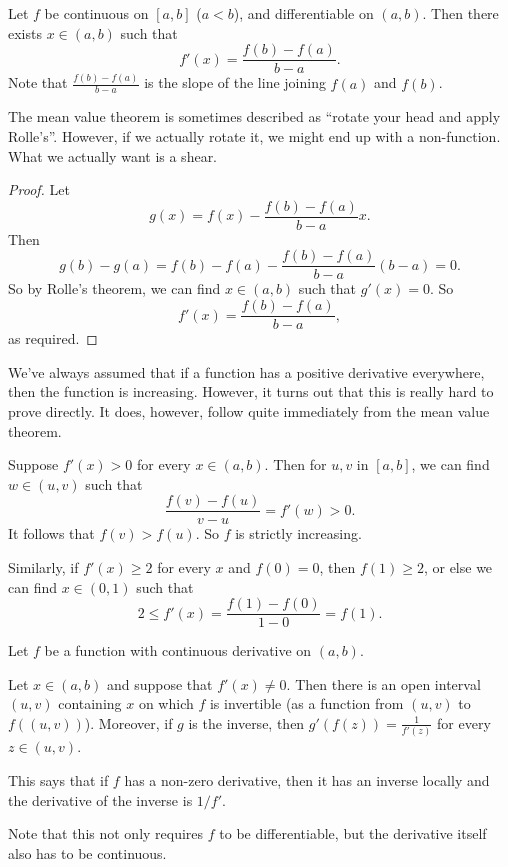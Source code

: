 \documentclass[a4paper]{article}
\begin{document}
\begin{cor}
  Let $f$ be continuous on $[a, b]$ ($a < b$), and differentiable on $(a, b)$. Then there exists $x\in (a, b)$ such that
  \[
    f'(x) = \frac{f(b) - f(a)}{b - a}.
  \]
  Note that $\frac{f(b) - f(a)}{b - a}$ is the slope of the line joining $f(a)$ and $f(b)$.
  \begin{center}
  \end{center}
\end{cor}

The mean value theorem is sometimes described as ``rotate your head and apply Rolle's''. However, if we actually rotate it, we might end up with a non-function. What we actually want is a shear.
\begin{proof}
  Let
  \[
    g(x) = f(x) - \frac{f(b) - f(a)}{b - a}x.
  \]
  Then
  \[
    g(b) - g(a) = f(b) - f(a) - \frac{f(b) - f(a)}{b - a}(b - a) = 0.
  \]
  So by Rolle's theorem, we can find $x\in (a, b)$ such that $g'(x) = 0$. So
  \[
    f'(x) = \frac{f(b) - f(a)}{b - a},
  \]
  as required.
\end{proof}

We've always assumed that if a function has a positive derivative everywhere, then the function is increasing. However, it turns out that this is really hard to prove directly. It does, however, follow quite immediately from the mean value theorem.
\begin{eg}
  Suppose $f'(x) > 0$ for every $x\in (a, b)$. Then for $u, v$ in $[a, b]$, we can find $w\in (u, v)$ such that
  \[
    \frac{f(v) - f(u)}{v - u} = f'(w) > 0.
  \]
  It follows that $f(v) > f(u)$. So $f$ is strictly increasing.

  Similarly, if $f'(x) \geq 2$ for every $x$ and $f(0) = 0$, then $f(1) \geq 2$, or else we can find $x\in (0, 1)$ such that
  \[
    2\leq f'(x) = \frac{f(1) - f(0)}{1 - 0} = f(1).
  \]
\end{eg}

\begin{thm}
  Let $f$ be a function with continuous derivative on $(a, b)$.

  Let $x\in (a, b)$ and suppose that $f'(x) \not= 0$. Then there is an open interval $(u, v)$ containing $x$ on which $f$ is invertible (as a function from $(u, v)$ to $f((u, v))$). Moreover, if $g$ is the inverse, then $g'(f(z)) = \frac{1}{f'(z)}$ for every $z\in (u, v)$.

  This says that if $f$ has a non-zero derivative, then it has an inverse locally and the derivative of the inverse is $1/f'$.
\end{thm}
Note that this not only requires $f$ to be differentiable, but the derivative itself also has to be continuous.
\end{document}
